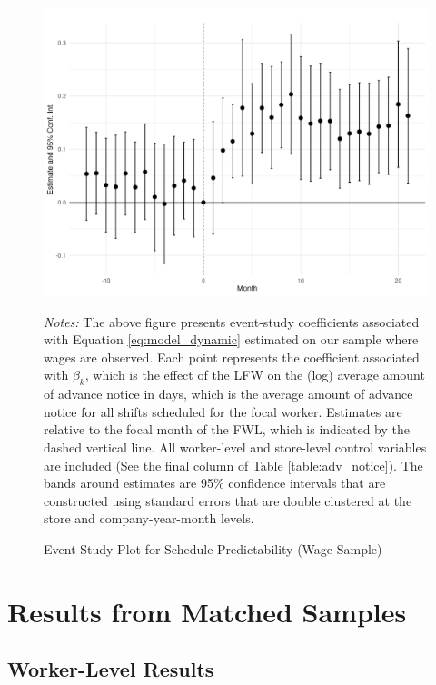 \documentclass[letterpaper,11pt,leqno]{article}
\theoremstyle{paper}
\newcommand{\note}[2][]{\parbox{\textwidth}{\footnotesize\vspace*{10pt}\textit{#1}#2}}
\begin{document}
\begin{figure}[H]
\centering
\caption{Event Study Plot for Schedule Predictability (Wage Sample)}
\includegraphics[scale=0.10]{Figures_Revision_2/advance_notice_es_new_wage_only.jpeg}
\vspace{-0.50cm}
\note{\scriptsize \singlespacing \textit{Notes: }  The above figure presents event-study coefficients associated with Equation \ref{eq:model_dynamic} estimated on our sample where wages are observed. Each point represents the coefficient associated with $\beta_{k}$, which is the effect of the LFW on the (log) average amount of advance notice in days, which is the average amount of advance notice for all shifts scheduled for the focal worker. Estimates are relative to the focal month of the FWL, which is indicated by the dashed vertical line. All worker-level and store-level control variables are included (See the final column of Table \ref{table:adv_notice}). The bands around estimates are 95\% confidence intervals that are constructed using standard errors that are double clustered at the store and company-year-month levels.}
\label{f:event_study_workers_wage_exists}
\end{figure}


\section{Results from Matched Samples}

\subsection{Worker-Level Results}
\end{document}
